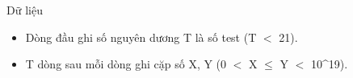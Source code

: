 Dữ liệu
\begin{itemize}
	\item     Dòng đầu ghi số nguyên dương T là số test (T $<$ 21).   
	\item     T dòng sau mỗi dòng ghi cặp số X, Y (0 $<$ X  $\le$  Y $<$ 10^19).   
\end{itemize}